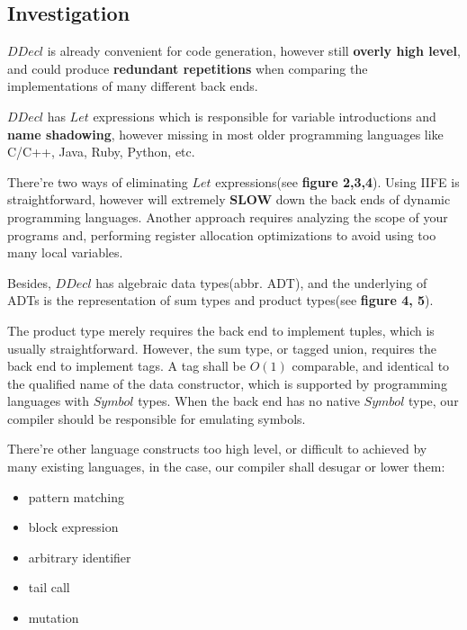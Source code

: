 \documentclass[a1,portrait]{a1poster}
\begin{document}
\begin{multicols}{2}
\captionsetup{font=normalsize}

\vspace {-0.5cm}
\section*{Investigation}

$DDecl$ is already convenient for code generation, however still \textbf{overly high level}, and could produce
\textbf{redundant repetitions} when comparing the implementations of many different back ends.


$DDecl$ has $Let$ expressions which is responsible for variable introductions
and \textbf{name shadowing}, however missing in most older programming languages like C/C++, Java, Ruby, Python, etc.

There're two ways of eliminating $Let$ expressions(see \textbf{figure 2,3,4}). Using IIFE is straightforward,
however will extremely \textbf{SLOW} down the back ends of dynamic programming languages. Another
approach requires analyzing the scope of your programs and, performing register allocation optimizations
to avoid using too many local variables. 


Besides, $DDecl$ has algebraic data types(abbr. ADT),
and the underlying of ADTs is the representation of sum types and product types(see \textbf{figure 4, 5}).

The product type merely requires the back end to implement tuples, which is usually straightforward.
However, the sum type, or tagged union, requires the back end to implement tags.
A tag shall be $O(1)$ comparable, and identical to the qualified name of the data constructor, which is
supported by programming languages with $Symbol$ types. When the back end has no native $Symbol$ type,
our compiler should be responsible for emulating symbols.

There're other language constructs too high level, or difficult to achieved by many existing languages,
in the case, our compiler shall desugar or lower them:

\vspace{-0.2cm}
\begin{itemize}
    \setlength\itemsep{-0.13em}
    \item pattern matching
    \item block expression \cite{gcc-stmt-expr} \cite{pep572}
    \item arbitrary identifier
    \item tail call
    \item mutation
\end{itemize}


\end{multicols}
\end{document}
